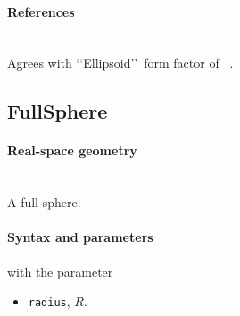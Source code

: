 \paragraph{References}\strut\\
Agrees with \lq\lq Ellipsoid\rq\rq\ form factor of \IsGISAXS~\cite{Laz02}.

\clearpage
\subsection{FullSphere} \label{sec:FullSphere}

\paragraph{Real-space geometry}\strut\\
A full sphere.

\begin{figure}[h]
\hfill
{}
\hfill
{}
\hfill
\end{figure}

\FloatBarrier

\paragraph{Syntax and parameters}
\begin{quote}
\end{quote}
with the parameter
\begin{itemize}
\item \texttt{radius}, $R$.
\end{itemize}

